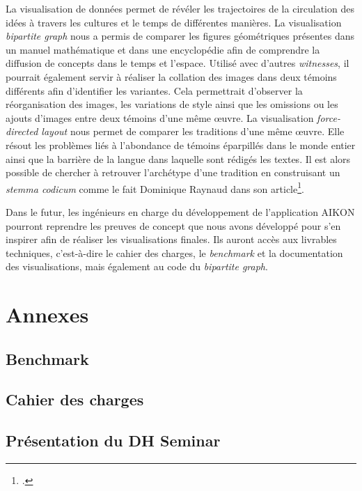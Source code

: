 \documentclass[a4paper,12pt,twoside]{book}
\newcommand{\clearemptydoublepage}{\newpage{\pagestyle{empty}\cleardoublepage}}
\begin{document}
	La visualisation de données permet de révéler les trajectoires de la circulation des idées à travers les cultures et le temps de différentes manières. La visualisation \textit{bipartite graph} nous a permis de comparer les figures géométriques présentes dans un manuel mathématique et dans une encyclopédie afin de comprendre la diffusion de concepts dans le temps et l'espace. Utilisé avec d'autres \textit{witnesses}, il pourrait également servir à réaliser la collation des images dans deux témoins différents afin d'identifier les variantes. Cela permettrait d'observer la réorganisation des images, les variations de style ainsi que les omissions ou les ajouts d'images entre deux témoins d'une même œuvre. La visualisation \textit{force-directed layout} nous permet de comparer les traditions d'une même œuvre. Elle résout les problèmes liés à l'abondance de témoins éparpillés dans le monde entier ainsi que la barrière de la langue dans laquelle sont rédigés les textes. Il est alors possible de chercher à retrouver l'archétype d'une tradition en construisant un \textit{stemma codicum} comme le fait Dominique Raynaud dans son article\footcite{raynaudBuildingStemmaCodicum2014}.
	
	Dans le futur, les ingénieurs en charge du développement de l'application AIKON pourront reprendre les preuves de concept que nous avons développé pour s'en inspirer afin de réaliser les visualisations finales. Ils auront accès aux livrables techniques, c'est-à-dire le cahier des charges, le \textit{benchmark} et la documentation des visualisations, mais également au code du \textit{bipartite graph}.
	
	

	
	\appendix
	\part*{Annexes}	
	
	\chapter[Benchmark]{\label{benchmark}Benchmark}
	
	 \clearemptydoublepage
	\chapter[Cahier des charges]{\label{cahierdescharges}Cahier des charges}
	
	 \clearemptydoublepage
	\chapter[Présentation du DH Seminar]{\label{dhseminar}Présentation du DH Seminar}
	
	\clearemptydoublepage
	
	\backmatter
	\printacronyms[title=Liste des acronymes,toctitle=Acronymes]
	\printglossary 
	\tableofcontents
	
\end{document}
